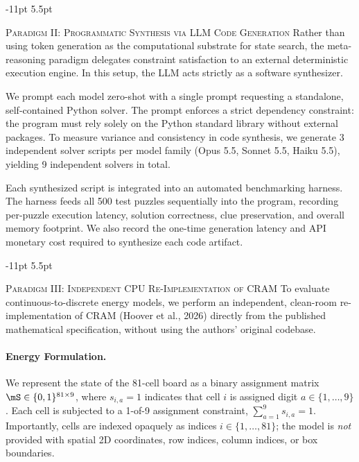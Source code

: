 \documentclass{article} %
\makeatletter
\renewcommand\subsection{\@startsection{subsection}{2}{\z@}%
  {-11pt \@plus -3pt \@minus -2pt}%
  {5.5pt \@plus 2pt}%
  {\normalfont\fontsize{10}{12}\selectfont\scshape\raggedright}}
\makeatother
\begin{document}
\subsection{\textsc{Paradigm II: Programmatic Synthesis via LLM Code Generation}}
\label{sec:method_paradigm2}
Rather than using token generation as the computational substrate for state search, the meta-reasoning paradigm delegates constraint satisfaction to an external deterministic execution engine. In this setup, the LLM acts strictly as a software synthesizer.

We prompt each model zero-shot with a single prompt requesting a standalone, self-contained Python solver. The prompt enforces a strict dependency constraint: the program must rely solely on the Python standard library without external packages. To measure variance and consistency in code synthesis, we generate 3 independent solver scripts per model family (Opus 5.5, Sonnet 5.5, Haiku 5.5), yielding 9 independent solvers in total.

Each synthesized script is integrated into an automated benchmarking harness. The harness feeds all 500 test puzzles sequentially into the program, recording per-puzzle execution latency, solution correctness, clue preservation, and overall memory footprint. We also record the one-time generation latency and API monetary cost required to synthesize each code artifact.

\subsection{\textsc{Paradigm III: Independent CPU Re-Implementation of CRAM}}
\label{sec:method_paradigm3}
To evaluate continuous-to-discrete energy models, we perform an independent, clean-room re-implementation of CRAM (Hoover et al., 2026) directly from the published mathematical specification, without using the authors' original codebase.

\paragraph{Energy Formulation.} We represent the state of the 81-cell board as a binary assignment matrix $\mS \in \{0, 1\}^{81 \times 9}$, where $s_{i, a} = 1$ indicates that cell $i$ is assigned digit $a \in \{1, \dots, 9\}$. Each cell is subjected to a 1-of-9 assignment constraint, $\sum_{a=1}^9 s_{i, a} = 1$. Importantly, cells are indexed opaquely as indices $i \in \{1, \dots, 81\}$; the model is \textit{not} provided with spatial 2D coordinates, row indices, column indices, or box boundaries.
\end{document}
